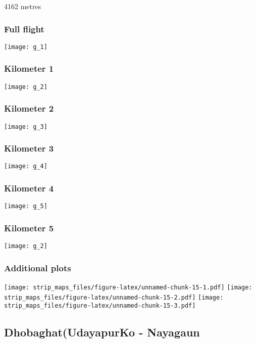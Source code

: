 \documentclass[]{article}
\begin{document}
4162 metres

\subsubsection{Full flight}\label{full-flight-6}

\texttt{[image: g\_1]}

\subsubsection{Kilometer 1}\label{kilometer-1-6}

\texttt{[image: g\_2]}

\subsubsection{Kilometer 2}\label{kilometer-2-6}

\texttt{[image: g\_3]}

\subsubsection{Kilometer 3}\label{kilometer-3-6}

\texttt{[image: g\_4]}

\subsubsection{Kilometer 4}\label{kilometer-4-6}

\texttt{[image: g\_5]}

\subsubsection{Kilometer 5}\label{kilometer-5-6}

\texttt{[image: g\_2]}

\subsubsection{Additional plots}\label{additional-plots-6}

\texttt{[image: strip\_maps\_files/figure-latex/unnamed-chunk-15-1.pdf]}
\texttt{[image: strip\_maps\_files/figure-latex/unnamed-chunk-15-2.pdf]}
\texttt{[image: strip\_maps\_files/figure-latex/unnamed-chunk-15-3.pdf]}

\newpage

\subsection{Dhobaghat(UdayapurKo -
Nayagaun}\label{dhobaghatudayapurko---nayagaun}
\end{document}
